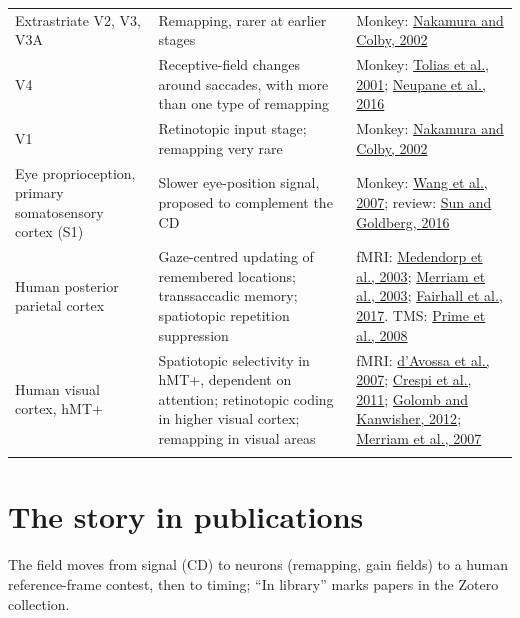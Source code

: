 \documentclass[11pt,a4paper]{article}
\begin{document}
{\begin{longtable}{>{\raggedright\arraybackslash}p{2.94cm}>{\raggedright\arraybackslash}p{4.78cm}>{\raggedright\arraybackslash}p{6.62cm}}
\addlinespace[2pt]
Extrastriate V2, V3, V3A & Remapping, rarer at earlier stages & Monkey: \href{https://doi.org/10.1073/pnas.052379899}{Nakamura and Colby, 2002} \\
\addlinespace[2pt]
V4 & Receptive-field changes around saccades, with more than one type of remapping & Monkey: \href{https://doi.org/10.1016/S0896-6273(01)00250-1}{Tolias et al., 2001}; \href{https://doi.org/10.1038/ncomms10402}{Neupane et al., 2016} \\
\addlinespace[2pt]
V1 & Retinotopic input stage; remapping very rare & Monkey: \href{https://doi.org/10.1073/pnas.052379899}{Nakamura and Colby, 2002} \\
\addlinespace[2pt]
Eye proprioception, primary somatosensory cortex (S1) & Slower eye-position signal, proposed to complement the CD & Monkey: \href{https://doi.org/10.1038/nn1878}{Wang et al., 2007}; review: \href{https://doi.org/10.1146/annurev-vision-082114-035407}{Sun and Goldberg, 2016} \\
\addlinespace[2pt]
Human posterior parietal cortex & Gaze-centred updating of remembered locations; transsaccadic memory; spatiotopic repetition suppression & fMRI: \href{https://doi.org/10.1523/JNEUROSCI.23-15-06209.2003}{Medendorp et al., 2003}; \href{https://doi.org/10.1016/S0896-6273(03)00393-3}{Merriam et al., 2003}; \href{https://www.sciencedirect.com/science/article/pii/S1053811916306899}{Fairhall et al., 2017}. TMS: \href{https://doi.org/10.1523/JNEUROSCI.0542-08.2008}{Prime et al., 2008} \\
\addlinespace[2pt]
Human visual cortex, hMT+ & Spatiotopic selectivity in hMT+, dependent on attention; retinotopic coding in higher visual cortex; remapping in visual areas & fMRI: \href{https://doi.org/10.1038/nn1824}{d'Avossa et al., 2007}; \href{https://doi.org/10.1371/journal.pone.0021661}{Crespi et al., 2011}; \href{https://doi.org/10.1093/cercor/bhr357}{Golomb and Kanwisher, 2012}; \href{https://doi.org/10.1152/jn.00189.2006}{Merriam et al., 2007} \\
\addlinespace[2pt]
\bottomrule
\end{longtable}}

\section{The story in publications}

The field moves from signal (CD) to neurons (remapping, gain fields) to a human reference-frame contest, then to timing; ``In library'' marks papers in the Zotero collection.
\end{document}
